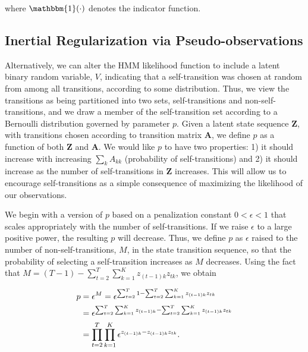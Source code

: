 \documentclass[letterpaper]{article}
\begin{document}
where $\mathbbm{1}(\cdot)$ denotes the indicator function.
\vspace{-0.1cm}
\subsection{Inertial Regularization via Pseudo-observations}
\vspace{-0.1cm}
Alternatively, we can alter the HMM likelihood function to include a latent binary random variable,
$V$, indicating that a self-transition was chosen at random from among all transitions, according to some distribution. 
Thus, we view the transitions as being partitioned into two sets, self-transitions and non-self-transitions, and
we draw a member of the self-transition set according to a Bernoulli
distribution governed by parameter $p$. Given a latent state sequence
$\mathbf{Z}$, with transitions chosen according to transition matrix
$\mathbf{A}$, we define $p$ as a function of both $\mathbf{Z}$ and $\mathbf{A}$.
We would like $p$ to have two properties: 1) it should increase with increasing
$\sum_k A_{kk}$ (probability of self-transitions) and 2) it should increase as
the number of self-transitions in $\mathbf{Z}$ increases. This will allow us to
encourage self-transitions as a simple consequence of maximizing the likelihood
of our observations.

We begin with a version of $p$ based on a penalization constant $0 < \epsilon <
1$ that scales appropriately with the number of self-transitions. If we raise
$\epsilon$ to a large positive power, the resulting $p$ will decrease. Thus, we
define $p$ as $\epsilon$ raised to the number of non-self-transitions, $M$, in
the state transition sequence, so that the probability of selecting a
self-transition increases as $M$ decreases. Using
the fact that $M=(T-1) - \sum^{T}_{t=2}\sum^{K}_{k=1}z_{(t-1)k}z_{tk}$, we obtain

\vspace{-0.5cm}
\begin{align}
    p &= \epsilon^M = \epsilon^{\sum^{T}_{t=2}1 -
    \sum^{T}_{t=2}\sum^{K}_{k=1}z_{(t-1)k}z_{tk}} \notag\\
      &= \epsilon^{\sum^{T}_{t=2}\sum^{K}_{k=1}z_{(t-1)k} - \sum^{T}_{t=2}\sum^{K}_{k=1}z_{(t-1)k}z_{tk}} \notag\\
      &= \prod^{T}_{t=2}\prod_{k=1}^{K}\epsilon^{z_{(t-1)k} - z_{(t-1)k}z_{tk}}. \label{eq:eps-0}
\end{align}
\vspace{-0.1cm}
\end{document}
